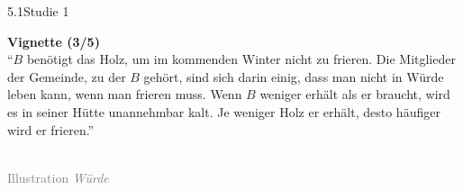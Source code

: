 \documentclass[xcolor=table,9pt,aspectratio=169]{beamer}
\begin{document}
\begin{frame}{\vspace*{10mm}5.1\hspace*{1em}Studie 1}
\begin{multicols}{2}
   \textbf{Vignette (3/5)}\\
   \medskip
   \enquote{$B$ benötigt das Holz, um im kommenden Winter nicht zu frieren. Die Mitglieder der Gemeinde, zu der $B$ gehört, sind sich darin einig, dass man nicht in Würde leben kann, wenn man frieren muss. Wenn $B$ weniger erhält als er braucht, wird es in seiner Hütte unannehmbar kalt. Je weniger Holz er erhält, desto häufiger wird er frieren.}
   \vfill
   \begin{center}
      \\
      \textcolor{gray}{Illustration \textit{Würde}}
   \end{center}
\end{multicols}
\end{frame}
\end{document}
